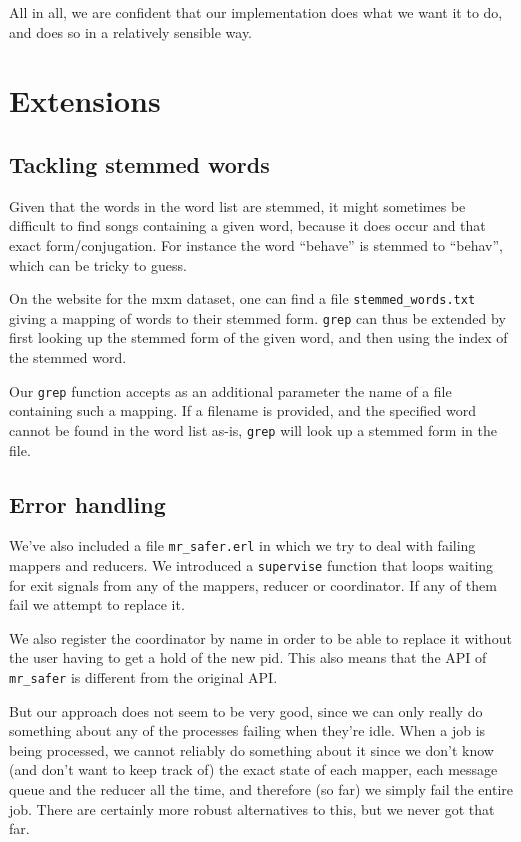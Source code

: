 \documentclass[a4paper]{article}
\begin{document}
All in all, we are confident that our implementation does what we want it to do, and does so in a relatively sensible way.

\section*{Extensions}

\subsection*{Tackling stemmed words}
Given that the words in the word list are stemmed, it might sometimes be difficult to find songs containing a given word, because it does occur and that exact form/conjugation. For instance the word ``behave'' is stemmed to ``behav'', which can be tricky to guess.

On the website for the mxm dataset, one can find a file \texttt{stemmed\_words.txt} giving a mapping of words to their stemmed form. \texttt{grep} can thus be extended by first looking up the stemmed form of the given word, and then using the index of the stemmed word. 

Our \texttt{grep} function accepts as an additional parameter the name of a file containing such a mapping. If a filename is provided, and the specified word cannot be found in the word list as-is, \texttt{grep} will look up a stemmed form in the file.

\subsection*{Error handling}
We've also included a file \texttt{mr\_safer.erl} in which we try to deal with failing mappers and reducers. We introduced a \texttt{supervise} function that loops waiting for exit signals from any of the mappers, reducer or coordinator. If any of them fail we attempt to replace it.

We also register the coordinator by name in order to be able to replace it without the user having to get a hold of the new pid. This also means that the API of \texttt{mr\_safer} is different from the original API.

But our approach does not seem to be very good, since we can only really do something about any of the processes failing when they're idle. When a job is being processed, we cannot reliably do something about it since we don't know (and don't want to keep track of) the exact state of each mapper, each message queue and the reducer all the time, and therefore (so far) we simply fail the entire job. There are certainly more robust alternatives to this, but we never got that far.
\end{document}
